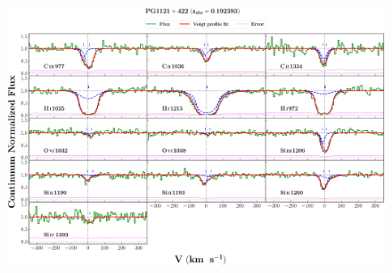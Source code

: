 \documentclass[12pt,draft]{report}
\begin{document}
\newpage

\begin{landscape}

\begin{figure}
    \centering
    \vspace{-20mm}
    \hspace*{-35mm}
    \includegraphics[width=1.25\linewidth]{System-Plots/PG1121+422_z=0.192393_sys_plot.png}
\end{figure}

\end{landscape}
\end{document}
